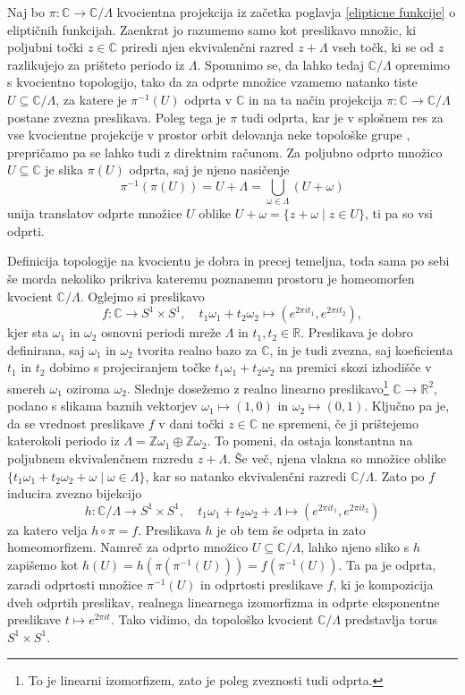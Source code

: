 \documentclass[mat1]{fmfdelo}
\numberwithin{equation}{section}
\newcommand{\R}{\mathbb R}
\newcommand{\Z}{\mathbb Z}
\newcommand{\C}{\mathbb C}
\newcommand{\om}{\omega}
\newcommand{\inv}{^{-1}}
\theoremstyle{definition}
\begin{document}
Naj bo $\pi: \C \to \C/\Lambda$ kvocientna projekcija iz začetka poglavja \ref{elipticne funkcije} o eliptičnih funkcijah. Zaenkrat jo razumemo samo kot preslikavo množic, ki poljubni točki $z \in \C$ priredi njen ekvivalenčni razred $z + \Lambda$ vseh točk, ki se od $z$ razlikujejo za prišteto periodo iz $\Lambda$. Spomnimo se, da lahko tedaj $\C/\Lambda$ opremimo s kvocientno topologijo, tako da za odprte množice vzamemo natanko tiste $U \subseteq \C/\Lambda$, za katere je $\pi\inv (U)$ odprta v $\C$ in na ta način projekcija $\pi:\C \to \C/\Lambda$ postane zvezna preslikava. Poleg tega je $\pi$ tudi odprta, kar je v splošnem res za vse kvocientne projekcije v prostor orbit delovanja neke topološke grupe \cite[Trditev...]{MrcunTop}, prepričamo pa se lahko tudi z direktnim računom. Za poljubno odprto množico $U \subseteq \C$ je slika $\pi(U)$ odprta, saj je njeno nasičenje
\[
    \pi\inv(\pi(U)) = U + \Lambda = \bigcup_{\om \in \Lambda} (U + \om)
\]
unija translatov odprte množice $U$ oblike $U + \om = \{z + \om \mid z \in U \}$, ti pa so vsi odprti. 

Definicija topologije na kvocientu je dobra in precej temeljna, toda sama po sebi še morda nekoliko prikriva kateremu poznanemu prostoru je homeomorfen kvocient $\C/\Lambda$. Oglejmo si preslikavo 
\[ 
    f: \C \to S^1 \times S^1, \quad t_1\om_1 + t_2\om_2 \mapsto (e^{2 \pi i t_1}, e^{2 \pi i t_2}),
\]
kjer sta $\om_1$ in $\om_2$ osnovni periodi mreže $\Lambda$ in $t_1, t_2 \in \R$. Preslikava je dobro definirana, saj $\om_1$ in $\om_2$ tvorita realno bazo za $\C$, in je tudi zvezna, saj koeficienta $t_1$ in $t_2$ dobimo s projeciranjem točke $t_1\om_1 + t_2\om_2$ na premici skozi izhodišče v smereh $\om_1$ oziroma $\om_2$. Slednje dosežemo z realno linearno preslikavo\footnote{To je linearni izomorfizem, zato je poleg zveznosti tudi odprta.} $\C \to \R^2$, podano s slikama baznih vektorjev $\om_1 \mapsto (1,0)$ in $\om_2 \mapsto (0,1)$. Ključno pa je, da se vrednost preslikave $f$ v dani točki $z \in \C$ ne spremeni, če ji prištejemo katerokoli periodo iz $\Lambda = \Z\om_1 \oplus \Z\om_2$. To pomeni, da ostaja konstantna na poljubnem ekvivalenčnem razredu $z + \Lambda$. Še več, njena vlakna so množice oblike $\{t_1\om_1 + t_2\om_2 + \om \mid \om \in \Lambda\}$, kar so natanko ekvivalenčni razredi $\C/\Lambda$. Zato po \cite[Trditev...]{MrcunTop} $f$ inducira zvezno bijekcijo 
\[
    h: \C/\Lambda \to S^1 \times S^1, \quad t_1\om_1 + t_2\om_2 + \Lambda \mapsto (e^{2 \pi i t_1}, e^{2 \pi i t_2})
\]
za katero velja $h \circ \pi = f$. Preslikava $h$ je ob tem še odprta in zato homeomorfizem. Namreč za odprto množico $U\subseteq \C/\Lambda$, lahko njeno sliko s $h$ zapišemo kot $h(U) = h(\pi(\pi\inv(U))) = f(\pi\inv(U))$. Ta pa je odprta, zaradi odprtosti množice $\pi\inv(U)$ in odprtosti preslikave $f$, ki je kompozicija dveh odprtih preslikav, realnega linearnega izomorfizma in odprte eksponentne preslikave $t \mapsto e^{2\pi i t}$. Tako vidimo, da topološko kvocient $\C/\Lambda$ predstavlja torus $S^1 \times S^1$.
\end{document}
